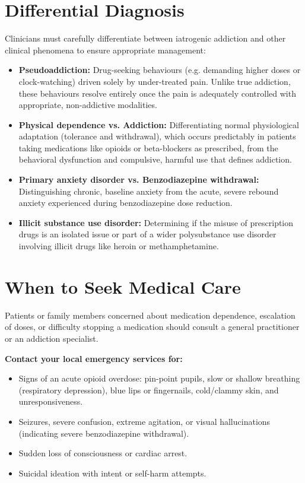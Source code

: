 \section*{Differential Diagnosis}
Clinicians must carefully differentiate between iatrogenic addiction and other clinical phenomena to ensure appropriate management:
\begin{itemize}
    \item \textbf{Pseudoaddiction:} Drug-seeking behaviours (e.g. demanding higher doses or clock-watching) driven solely by under-treated pain. Unlike true addiction, these behaviours resolve entirely once the pain is adequately controlled with appropriate, non-addictive modalities.
    \item \textbf{Physical dependence vs. Addiction:} Differentiating normal physiological adaptation (tolerance and withdrawal), which occurs predictably in patients taking medications like opioids or beta-blockers as prescribed, from the behavioral dysfunction and compulsive, harmful use that defines addiction.
    \item \textbf{Primary anxiety disorder vs. Benzodiazepine withdrawal:} Distinguishing chronic, baseline anxiety from the acute, severe rebound anxiety experienced during benzodiazepine dose reduction.
    \item \textbf{Illicit substance use disorder:} Determining if the misuse of prescription drugs is an isolated issue or part of a wider polysubstance use disorder involving illicit drugs like heroin or methamphetamine.
\end{itemize}

\section*{When to Seek Medical Care}
Patients or family members concerned about medication dependence, escalation of doses, or difficulty stopping a medication should consult a general practitioner or an addiction specialist.

\textbf{Contact your local emergency services for:}
\begin{itemize}
    \item Signs of an acute opioid overdose: pin-point pupils, slow or shallow breathing (respiratory depression), blue lips or fingernails, cold/clammy skin, and unresponsiveness.
    \item Seizures, severe confusion, extreme agitation, or visual hallucinations (indicating severe benzodiazepine withdrawal).
    \item Sudden loss of consciousness or cardiac arrest.
    \item Suicidal ideation with intent or self-harm attempts.
\end{itemize}

